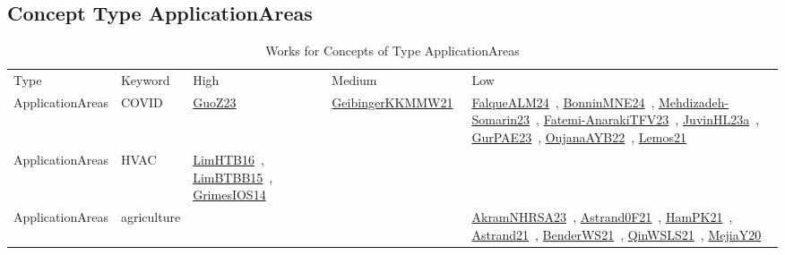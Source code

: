 \clearpage
\subsection{Concept Type ApplicationAreas}
\label{sec:ApplicationAreas}
{\scriptsize
\begin{longtable}{lp{3cm}>{\raggedright\arraybackslash}p{6cm}>{\raggedright\arraybackslash}p{6cm}>{\raggedright\arraybackslash}p{8cm}}
\rowcolor{white}\caption{Works for Concepts of Type ApplicationAreas}\\ \toprule
\rowcolor{white}Type & Keyword & High & Medium & Low\\ \midrule\endhead
\bottomrule
\endfoot
ApplicationAreas & COVID & \href{../works/GuoZ23.pdf}{GuoZ23}~\cite{GuoZ23} & \href{../works/GeibingerKKMMW21.pdf}{GeibingerKKMMW21}~\cite{GeibingerKKMMW21} & \href{../works/FalqueALM24.pdf}{FalqueALM24}~\cite{FalqueALM24}, \href{../works/BonninMNE24.pdf}{BonninMNE24}~\cite{BonninMNE24}, \href{../works/Mehdizadeh-Somarin23.pdf}{Mehdizadeh-Somarin23}~\cite{Mehdizadeh-Somarin23}, \href{../works/Fatemi-AnarakiTFV23.pdf}{Fatemi-AnarakiTFV23}~\cite{Fatemi-AnarakiTFV23}, \href{../works/JuvinHL23a.pdf}{JuvinHL23a}~\cite{JuvinHL23a}, \href{../works/GurPAE23.pdf}{GurPAE23}~\cite{GurPAE23}, \href{../works/OujanaAYB22.pdf}{OujanaAYB22}~\cite{OujanaAYB22}, \href{../works/Lemos21.pdf}{Lemos21}~\cite{Lemos21}\\
ApplicationAreas & HVAC & \href{../works/LimHTB16.pdf}{LimHTB16}~\cite{LimHTB16}, \href{../works/LimBTBB15.pdf}{LimBTBB15}~\cite{LimBTBB15}, \href{../works/GrimesIOS14.pdf}{GrimesIOS14}~\cite{GrimesIOS14} &  & \\
ApplicationAreas & agriculture &  &  & \href{../works/AkramNHRSA23.pdf}{AkramNHRSA23}~\cite{AkramNHRSA23}, \href{../works/Astrand0F21.pdf}{Astrand0F21}~\cite{Astrand0F21}, \href{../works/HamPK21.pdf}{HamPK21}~\cite{HamPK21}, \href{../works/Astrand21.pdf}{Astrand21}~\cite{Astrand21}, \href{../works/BenderWS21.pdf}{BenderWS21}~\cite{BenderWS21}, \href{../works/QinWSLS21.pdf}{QinWSLS21}~\cite{QinWSLS21}, \href{../works/MejiaY20.pdf}{MejiaY20}~\cite{MejiaY20}\\

\end{longtable}}
